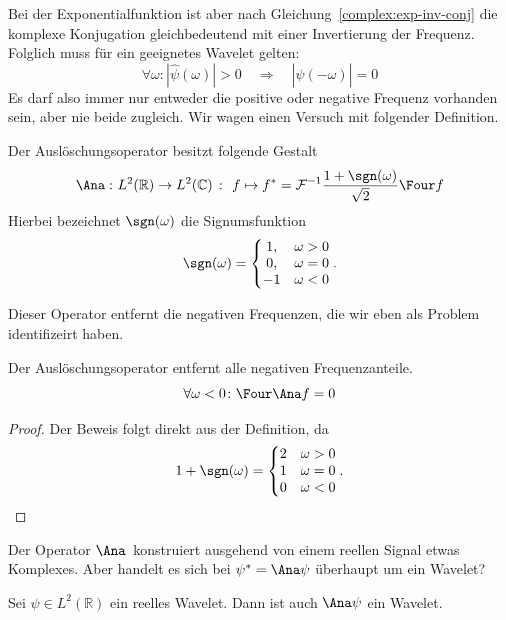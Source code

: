 Bei der Exponentialfunktion ist aber nach Gleichung~\ref{complex:exp-inv-conj} die komplexe Konjugation gleichbedeutend mit einer Invertierung der Frequenz.
Folglich muss für ein geeignetes Wavelet gelten:
\[
	\forall \omega \colon |\hat\psi(\omega)| > 0 
	\quad\Rightarrow\quad
	|\hat\psi(-\omega)| = 0 
\]
Es darf also immer nur entweder die positive oder negative Frequenz vorhanden sein, aber nie beide zugleich.
Wir wagen einen Versuch mit folgender Definition.
\begin{definition}
	Der Auslöschungsoperator besitzt folgende Gestalt
		\[\Ana\, \colon L^2(\mathbb R) \to L^2(\mathbb C)
		~\colon~
		f \mapsto f^\ast = \mathcal{F}^{-1}\frac{1+\sgn(\omega)}{\sqrt 2}\Four f\]
	Hierbei bezeichnet $\sgn(\omega)$ die Signumsfunktion
	\[\sgn(\omega) = \left\lbrace\begin{matrix} 1, & \omega > 0 \\ 0, &\omega = 0 \\ -1 & \omega < 0 \end{matrix}\right..\]
\end{definition}
Dieser Operator entfernt die negativen Frequenzen, die wir eben als Problem identifizeirt haben.
\begin{lemma}
	Der Auslöschungsoperator entfernt alle negativen Frequenzanteile.
	\[\forall \omega < 0 \colon \Four\Ana f = 0\]
\end{lemma}
\begin{proof}
	Der Beweis folgt direkt aus der Definition, da
	\[
		1+\sgn(\omega) = 
		\left\lbrace\begin{matrix}
		2 & \omega > 0\\
		1 & \omega = 0\\
		0 & \omega < 0
		\end{matrix}\right..\qedhere
	\]
\end{proof}
Der Operator $\Ana\,$ konstruiert ausgehend von einem reellen Signal etwas Komplexes.
Aber handelt es sich bei $\psi^\ast = \Ana\psi$ überhaupt um ein Wavelet?

\begin{satz}
	Sei $\psi \in L^2(\mathbb R)$ ein reelles Wavelet.
	Dann ist auch $\Ana\psi$ ein Wavelet.
\end{satz}


